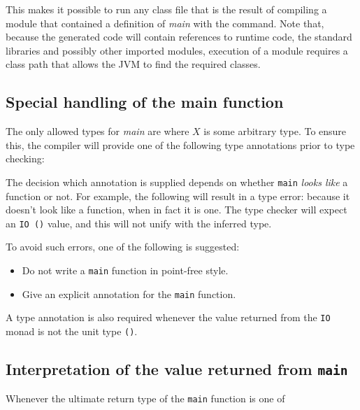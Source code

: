 This makes it possible to run any class file that is the result of compiling a \frege{} module that contained a definition of \emph{main} with the  command. Note that, because the generated \java{} code will contain references to \frege{} runtime code, the standard libraries and possibly other imported \frege{} modules, execution of a \frege{} module requires a class path that allows the JVM to find the required classes.


\subsection*{Special handling of the main function}

The only allowed types for \emph{main} are 
where $X$ is some arbitrary type. 
To ensure this, the compiler will provide one of the following type annotations prior to type checking: 

The decision which annotation is supplied depends on whether \texttt{main} \emph{looks like} a function or not.
For example, the following will result in a type error: 
because it doesn't look like a function, when in fact it is one.  
The type checker will expect an \texttt{IO ()} value, and this will not unify with the inferred type.

To avoid such errors, one of the following is suggested:
\begin{itemize}
\item Do not write a \texttt{main} function in point-free style.
\item Give an explicit annotation for the \texttt{main} function.
\end{itemize}

A type annotation is also required whenever the value returned from the \texttt{IO} monad is not the unit type \texttt{()}.

\subsection*{Interpretation of the value returned from \texttt{main}}

Whenever the ultimate return type of the \texttt{main} function is one of 

